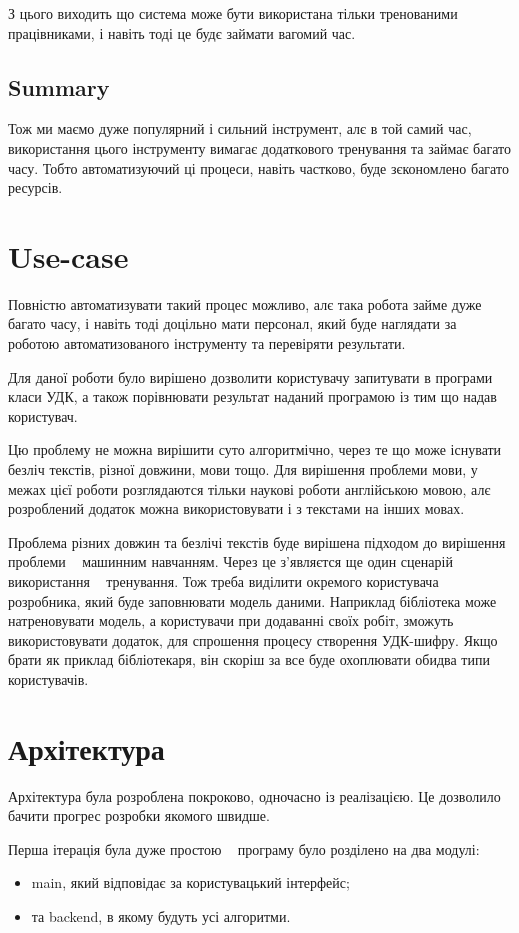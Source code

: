 \documentclass{article}
\let\oldsection\section
\renewcommand{\section}{\clearpage\oldsection}
\begin{document}
З цього виходить що система може бути використана тільки тренованими працівниками,
і навіть тоді це будє займати вагомий час.

\subsection{Summary}
Тож ми маємо дуже популярний і сильний інструмент, алє в той самий час,
використання цього інструменту вимагає додаткового тренування та займає багато часу.
Тобто автоматизуючий ці процеси, навіть частково, буде зєкономлено багато ресурсів.

\section{Use-case}
Повністю автоматизувати такий процес можливо,
алє така робота займе дуже багато часу, і навіть тоді доцільно мати персонал,
який буде наглядати за роботою автоматизованого інструменту та перевіряти результати.

Для даної роботи було вирішено дозволити користувачу запитувати в програми класи УДК,
а також порівнювати результат наданий програмою із тим що надав користувач.

Цю проблему не можна вирішити суто алгоритмічно, через те що може існувати безліч текстів,
різної довжини, мови тощо.
Для вирішення проблеми мови, у межах цієї роботи розглядаются тільки
наукові роботи англійською мовою, алє розроблений додаток можна використовувати
і з текстами на інших мовах.

Проблема різних довжин та безлічі текстів буде вирішена підходом до вирішення проблеми 
\textemdash~ машинним навчанням.
Через це з'являєтся ще один сценарій використання \textemdash~ тренування.
Тож треба виділити окремого користувача \textemdash~ розробника, який буде заповнювати модель даними.
Наприклад бібліотека може натреновувати модель, а користувачи при додаванні своїх робіт,
зможуть використовувати додаток, для спрошення процесу створення УДК-шифру.
Якщо брати як приклад бібліотекаря, він скоріш за все буде охоплювати обидва типи користувачів.

\section{Архітектура}
Архітектура була розроблена покроково, одночасно із реалізацією.
Це дозволило бачити прогрес розробки якомого швидше.

Перша ітерація була дуже простою \textemdash~ програму було розділено на два модулі:
\begin{itemize}
\item main, який відповідає за користувацький інтерфейс;
\item та backend, в якому будуть усі алгоритми.
\end{itemize}
\end{document}
